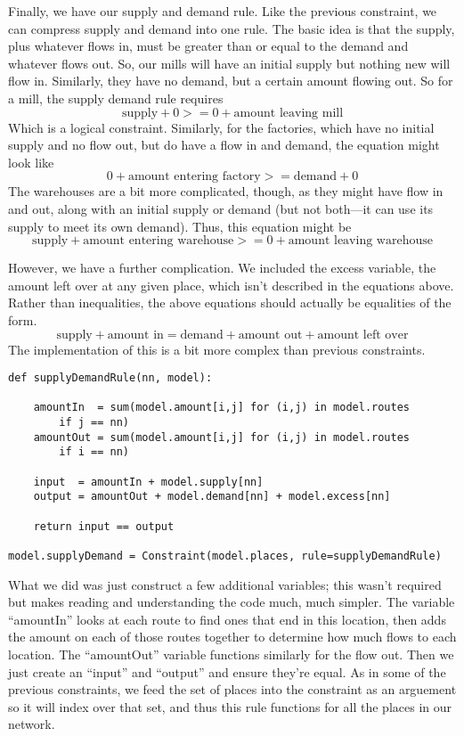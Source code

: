 \documentclass{article}
\begin{document}
Finally, we have our supply and demand rule.  Like the previous constraint, we can compress supply and demand into one rule.  The basic idea is that the supply, plus whatever flows in, must be greater than or equal to the demand and whatever flows out.  So, our mills will have an initial supply but nothing new will flow in.  Similarly, they have no demand, but a certain amount flowing out.  So for a mill, the supply demand rule requires
$$\textrm{supply} + 0 >= 0 + \textrm{amount leaving mill}$$
Which is a logical constraint.  Similarly, for the factories, which have no initial supply and no flow out, but do have a flow in and demand, the equation might look like
$$0 + \textrm{amount entering factory} >= \textrm{demand} +0$$
The warehouses are a bit more complicated, though, as they might have flow in and out, along with an initial supply or demand (but not both---it can use its supply to meet its own demand).  Thus, this equation might be
$$\textrm{supply} +\textrm{amount entering warehouse} >= 0 + \textrm{amount leaving warehouse}$$

However, we have a further complication.  We included the excess variable, the amount left over at any given place, which isn't described in the equations above.  Rather than inequalities, the above equations should actually be equalities of the form.
$$\textrm{supply} +\textrm{amount in} = \textrm{demand} +\textrm{amount out} +\textrm{amount left over}$$
The implementation of this is a bit more complex than previous constraints.

\begin{verbatim}
def supplyDemandRule(nn, model):
    
    amountIn  = sum(model.amount[i,j] for (i,j) in model.routes 
        if j == nn)
    amountOut = sum(model.amount[i,j] for (i,j) in model.routes 
        if i == nn)
    
    input  = amountIn + model.supply[nn]
    output = amountOut + model.demand[nn] + model.excess[nn]
    
    return input == output

model.supplyDemand = Constraint(model.places, rule=supplyDemandRule)
\end{verbatim}

What we did was just construct a few additional variables; this wasn't required but makes reading and understanding the code much, much simpler.  The variable ``amountIn'' looks at each route to find ones that end in this location, then adds the amount on each of those routes together to determine how much flows to each location.  The ``amountOut'' variable functions similarly for the flow out.  Then we just create an ``input'' and ``output'' and ensure they're equal.  As in some of the previous constraints, we feed the set of places into the constraint as an arguement so it will index over that set, and thus this rule functions for all the places in our network.
\end{document}
